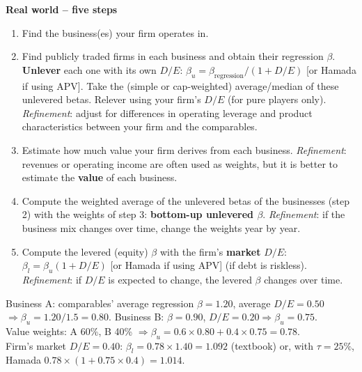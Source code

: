 \textbf{Real world -- five steps}
\begin{enumerate}
  \item Find the business(es) your firm operates in.
  \item Find publicly traded firms in each business and obtain their regression $\beta$. \textbf{Unlever} each one with its own $D/E$: $\beta_u=\beta_{\text{regression}}/(1+D/E)$ [or Hamada if using APV]. Take the (simple or cap-weighted) average/median of these unlevered betas. Relever using your firm's $D/E$ (for pure players only). \emph{Refinement}: adjust for differences in operating leverage and product characteristics between your firm and the comparables.
  \item Estimate how much value your firm derives from each business. \emph{Refinement}: revenues or operating income are often used as weights, but it is better to estimate the \textbf{value} of each business.
  \item Compute the weighted average of the unlevered betas of the businesses (step 2) with the weights of step 3: \textbf{bottom-up unlevered $\beta$}. \emph{Refinement}: if the business mix changes over time, change the weights year by year.
  \item Compute the levered (equity) $\beta$ with the firm's \textbf{market} $D/E$: $\beta_l=\beta_u(1+D/E)$ [or Hamada if using APV] (if debt is riskless). \emph{Refinement}: if $D/E$ is expected to change, the levered $\beta$ changes over time.
\end{enumerate}

\begin{exbox}
Business A: comparables' average regression $\beta=1.20$, average $D/E=0.50$ $\Rightarrow\beta_u=1.20/1.5=0.80$. Business B: $\beta=0.90$, $D/E=0.20\Rightarrow\beta_u=0.75$.\\
Value weights: A 60\%, B 40\% $\Rightarrow\beta_u=0.6\times0.80+0.4\times0.75=0.78$.\\
Firm's market $D/E=0.40$: $\beta_l=0.78\times1.40=\mathbf{1.092}$ (textbook) or, with $\tau=25\%$, Hamada $0.78\times(1+0.75\times0.4)=\mathbf{1.014}$.
\end{exbox}

